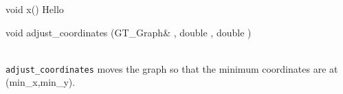 \begin{Cdefinition}
  
\item[void x()]
Hello

\item[void adjust\_coordinates (GT\_Graph\& \Param{g},
double \Param{min\_x}, double \Param{min\_y})]
\strut\\
\texttt{adjust\_coordinates} moves the graph so that the minimum
coordinates are at (min\_x,min\_y).

\end{Cdefinition}

